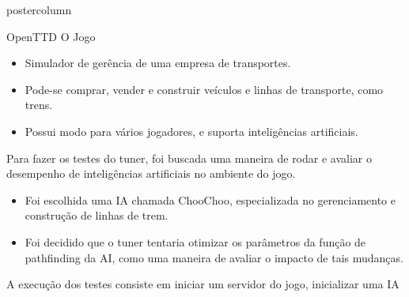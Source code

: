 \documentclass[final]{beamer}
\newlength{\columnheight}
\begin{document}
\begin{frame}
\begin{columns}
    \begin{column}{.5\textwidth}
      \begin{beamercolorbox}[center,wd=\textwidth]{postercolumn}
        \begin{minipage}[T]{.95\textwidth} %
          \parbox[t][\columnheight]{\textwidth}{ %
            
            \vspace*{0.8cm}
            
            \begin{block}{OpenTTD}
                O Jogo
                \begin{itemize}
                  \item Simulador de gerência de uma empresa de transportes.
                  \item Pode-se comprar, vender e construir veículos e linhas de transporte, como trens.
                  \item Possui modo para vários jogadores, e suporta inteligências artificiais.
                \end{itemize}
                
                \vspace*{0.5cm}
                Para fazer os testes do tuner, foi buscada uma maneira de rodar e avaliar o desempenho de inteligências artificiais no ambiente do jogo.
                \begin{itemize}
                  \item Foi escolhida uma IA chamada ChooChoo, especializada no gerenciamento e construção de linhas de trem.
                  \item Foi decidido que o tuner tentaria otimizar os parâmetros da função de pathfinding da AI, como uma maneira de avaliar o impacto de tais mudanças.
                \end{itemize}  
                         
                \vspace*{0,5cm}
                
                A execução dos testes consiste em iniciar um servidor do jogo, inicializar uma IA
                

\end{block}}
\end{minipage}
\end{beamercolorbox}
\end{column}
\end{columns}
\end{frame}
\end{document}
